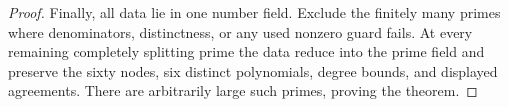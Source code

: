 \begin{proof}
Finally, all data lie in one number field.  Exclude the finitely many
primes where denominators, distinctness, or any used nonzero guard fails.
At every remaining completely splitting prime the data reduce into the
prime field and preserve the sixty nodes, six distinct polynomials,
degree bounds, and displayed agreements.  There are arbitrarily large
such primes, proving the theorem.
\end{proof}
